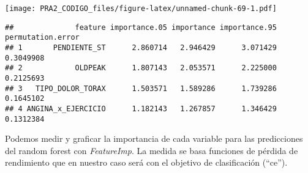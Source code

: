 \documentclass[
]{article}
\newenvironment{Shaded}{\begin{snugshade}}{\end{snugshade}}
\newcommand{\AttributeTok}[1]{\textcolor[rgb]{0.80,0.80,0.80}{#1}}
\newcommand{\DecValTok}[1]{\textcolor[rgb]{0.86,0.86,0.80}{#1}}
\newcommand{\FunctionTok}[1]{\textcolor[rgb]{0.94,0.94,0.56}{#1}}
\newcommand{\NormalTok}[1]{\textcolor[rgb]{0.80,0.80,0.80}{#1}}
\newcommand{\OtherTok}[1]{\textcolor[rgb]{0.94,0.94,0.56}{#1}}
\newcommand{\SpecialCharTok}[1]{\textcolor[rgb]{0.86,0.64,0.64}{#1}}
\newcommand{\StringTok}[1]{\textcolor[rgb]{0.80,0.58,0.58}{#1}}
\begin{document}
\begin{Shaded}
\end{Shaded}

\texttt{[image: PRA2\_CODIGO\_files/figure-latex/unnamed-chunk-69-1.pdf]}

\begin{Shaded}
\end{Shaded}

\begin{verbatim}
##              feature importance.05 importance importance.95 permutation.error
## 1       PENDIENTE_ST      2.860714   2.946429      3.071429         0.3049908
## 2            OLDPEAK      1.807143   2.053571      2.225000         0.2125693
## 3   TIPO_DOLOR_TORAX      1.503571   1.589286      1.739286         0.1645102
## 4 ANGINA_x_EJERCICIO      1.182143   1.267857      1.346429         0.1312384
\end{verbatim}

Podemos medir y graficar la importancia de cada variable para las
predicciones del random forest con \emph{FeatureImp}. La medida se basa
funciones de pérdida de rendimiento que en nuestro caso será con el
objetivo de clasificación (``ce'').
\end{document}
